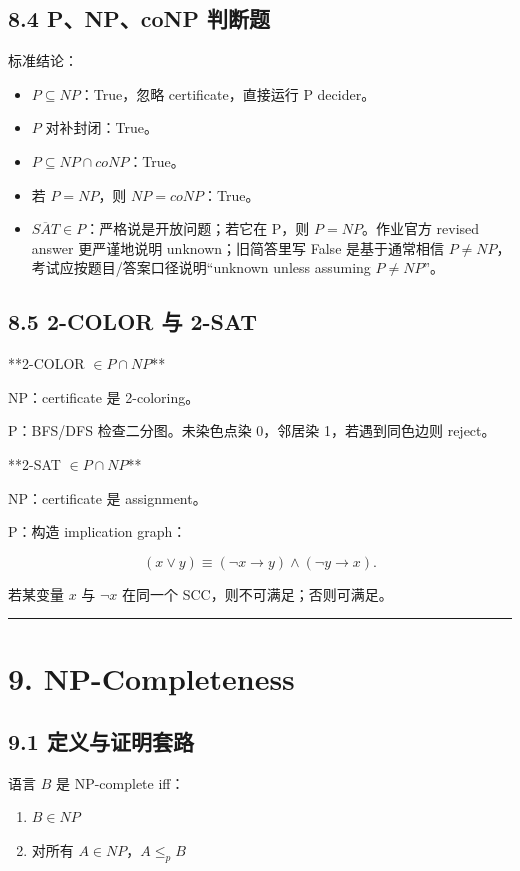 ﻿\documentclass[UTF8,11pt]{ctexart}
\begin{document}
\subsection{8.4 P、NP、coNP 判断题}


标准结论：


\begin{itemize}
\item \(P\subseteq NP\)：True，忽略 certificate，直接运行 P decider。
\item \(P\) 对补封闭：True。
\item \(P\subseteq NP\cap coNP\)：True。
\item 若 \(P=NP\)，则 \(NP=coNP\)：True。
\item \(\overline{SAT}\in P\)：严格说是开放问题；若它在 P，则 \(P=NP\)。作业官方 revised answer 更严谨地说明 unknown；旧简答里写 False 是基于通常相信 \(P\ne NP\)，考试应按题目/答案口径说明“unknown unless assuming \(P\ne NP\)”。
\end{itemize}


\subsection{8.5 2-COLOR 与 2-SAT}


**2-COLOR \(\in P\cap NP\)**  

NP：certificate 是 2-coloring。  

P：BFS/DFS 检查二分图。未染色点染 0，邻居染 1，若遇到同色边则 reject。


**2-SAT \(\in P\cap NP\)**  

NP：certificate 是 assignment。  

P：构造 implication graph：

\[
(x\vee y)\equiv(\neg x\to y)\wedge(\neg y\to x).
\]

若某变量 \(x\) 与 \(\neg x\) 在同一个 SCC，则不可满足；否则可满足。


\bigskip\hrule\bigskip


\section{9. NP-Completeness}


\subsection{9.1 定义与证明套路}


语言 \(B\) 是 NP-complete iff：


\begin{enumerate}
\item \(B\in NP\)
\item 对所有 \(A\in NP\)，\(A\le_p B\)
\end{enumerate}
\end{document}
